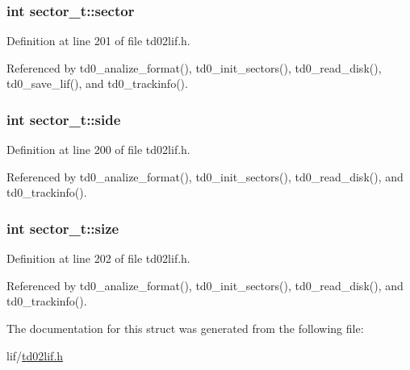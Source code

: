 \subsubsection[{\texorpdfstring{sector}{sector}}]{\setlength{\rightskip}{0pt plus 5cm}int sector\+\_\+t\+::sector}\hypertarget{structsector__t_ac4920b9f7c5e2e9d67f3d2aca7a7191f}{}\label{structsector__t_ac4920b9f7c5e2e9d67f3d2aca7a7191f}


Definition at line 201 of file td02lif.\+h.



Referenced by td0\+\_\+analize\+\_\+format(), td0\+\_\+init\+\_\+sectors(), td0\+\_\+read\+\_\+disk(), td0\+\_\+save\+\_\+lif(), and td0\+\_\+trackinfo().

\subsubsection[{\texorpdfstring{side}{side}}]{\setlength{\rightskip}{0pt plus 5cm}int sector\+\_\+t\+::side}\hypertarget{structsector__t_a78a5489776ec87f0146b56bf9ed69ee9}{}\label{structsector__t_a78a5489776ec87f0146b56bf9ed69ee9}


Definition at line 200 of file td02lif.\+h.



Referenced by td0\+\_\+analize\+\_\+format(), td0\+\_\+init\+\_\+sectors(), td0\+\_\+read\+\_\+disk(), and td0\+\_\+trackinfo().

\subsubsection[{\texorpdfstring{size}{size}}]{\setlength{\rightskip}{0pt plus 5cm}int sector\+\_\+t\+::size}\hypertarget{structsector__t_ab7886bbfbf6610a6324acbff76cd8fe0}{}\label{structsector__t_ab7886bbfbf6610a6324acbff76cd8fe0}


Definition at line 202 of file td02lif.\+h.



Referenced by td0\+\_\+analize\+\_\+format(), td0\+\_\+init\+\_\+sectors(), td0\+\_\+read\+\_\+disk(), and td0\+\_\+trackinfo().



The documentation for this struct was generated from the following file\+:\begin{DoxyCompactItemize}
\item 
lif/\hyperlink{td02lif_8h}{td02lif.\+h}\end{DoxyCompactItemize}
